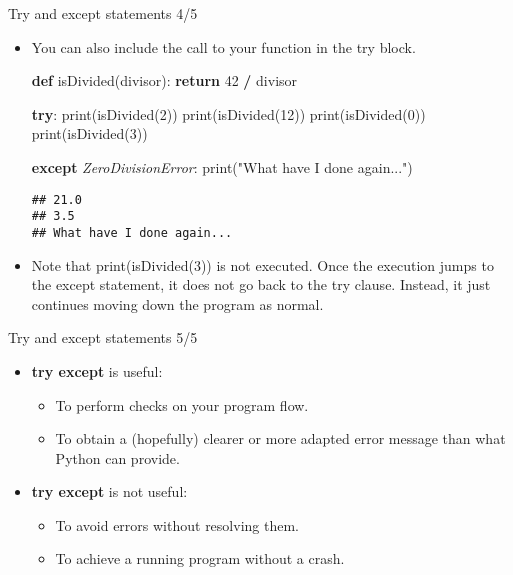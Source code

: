 \documentclass[
  8pt,
  ignorenonframetext,
]{beamer}
\newenvironment{Shaded}{\begin{snugshade}}{\end{snugshade}}
\newcommand{\BuiltInTok}[1]{#1}
\newcommand{\ControlFlowTok}[1]{\textcolor[rgb]{0.13,0.29,0.53}{\textbf{#1}}}
\newcommand{\DecValTok}[1]{\textcolor[rgb]{0.00,0.00,0.81}{#1}}
\newcommand{\KeywordTok}[1]{\textcolor[rgb]{0.13,0.29,0.53}{\textbf{#1}}}
\newcommand{\NormalTok}[1]{#1}
\newcommand{\OperatorTok}[1]{\textcolor[rgb]{0.81,0.36,0.00}{\textbf{#1}}}
\newcommand{\PreprocessorTok}[1]{\textcolor[rgb]{0.56,0.35,0.01}{\textit{#1}}}
\newcommand{\StringTok}[1]{\textcolor[rgb]{0.31,0.60,0.02}{#1}}
\providecommand{\tightlist}{%
  \setlength{\itemsep}{0pt}\setlength{\parskip}{0pt}}
\begin{document}
\begin{frame}[fragile]{Try and except statements 4/5}
\protect\hypertarget{try-and-except-statements-45}{}
\begin{itemize}[<+->]
\item
  You can also include the call to your function in the try block.

\begin{Shaded}
\begin{Highlighting}[]
\KeywordTok{def}\NormalTok{ isDivided(divisor):}
  \ControlFlowTok{return} \DecValTok{42} \OperatorTok{/}\NormalTok{ divisor}

\ControlFlowTok{try}\NormalTok{:}
  \BuiltInTok{print}\NormalTok{(isDivided(}\DecValTok{2}\NormalTok{))}
  \BuiltInTok{print}\NormalTok{(isDivided(}\DecValTok{12}\NormalTok{))}
  \BuiltInTok{print}\NormalTok{(isDivided(}\DecValTok{0}\NormalTok{))}
  \BuiltInTok{print}\NormalTok{(isDivided(}\DecValTok{3}\NormalTok{))}

\ControlFlowTok{except} \PreprocessorTok{ZeroDivisionError}\NormalTok{:}
  \BuiltInTok{print}\NormalTok{(}\StringTok{"What have I done again..."}\NormalTok{)}
\end{Highlighting}
\end{Shaded}

\begin{verbatim}
## 21.0
## 3.5
## What have I done again...
\end{verbatim}
\end{itemize}

\begin{itemize}[<+->]
\tightlist
\item
  Note that print(isDivided(3)) is not executed. Once the execution
  jumps to the except statement, it does not go back to the try clause.
  Instead, it just continues moving down the program as normal.
\end{itemize}
\end{frame}

\begin{frame}{Try and except statements 5/5}
\protect\hypertarget{try-and-except-statements-55}{}
\begin{itemize}
\tightlist
\item
  \textbf{try except} is useful:

  \begin{itemize}
  \tightlist
  \item
    To perform checks on your program flow.
  \item
    To obtain a (hopefully) clearer or more adapted error message than
    what Python can provide.
  \end{itemize}
\item
  \textbf{try except} is not useful:

  \begin{itemize}
  \tightlist
  \item
    To avoid errors without resolving them.
  \item
    To achieve a running program without a crash.
  \end{itemize}
\end{itemize}
\end{frame}
\end{document}

